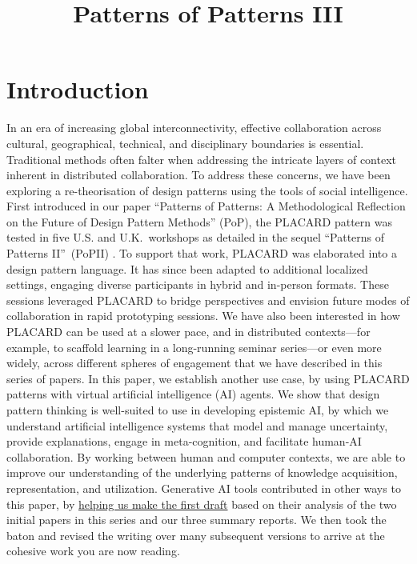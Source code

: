 \documentclass[acmlarge,timestamp]{acmart}
\date{}
\title{Patterns of Patterns III}
\begin{document}



\section{Introduction}\label{sec:intro}

In an era of increasing global interconnectivity, effective collaboration across cultural, geographical, technical, and disciplinary boundaries is essential. Traditional methods often falter when addressing the intricate layers of context inherent in distributed collaboration.  To address these concerns, we have been exploring a re-theorisation of design patterns using the tools of social intelligence.  First introduced in our paper “Patterns of Patterns: A Methodological Reflection on the Future of Design Pattern Methods” (PoP), the PLACARD pattern was tested in five U.S. and U.K.~workshops as detailed in the sequel “Patterns of Patterns II”~(PoPII) \cite{10.5555/3712039.3712044,10.5555/3721041.3721050}.  To support that work, PLACARD was elaborated into a design pattern language.  It has since been adapted to additional localized settings, engaging diverse participants in hybrid and in-person formats. These sessions leveraged PLACARD to bridge perspectives and envision future modes
of collaboration in rapid prototyping sessions.  We have also been interested in how PLACARD can be used at a slower pace, and in distributed contexts—for example, to scaffold learning in a long-running seminar series—or even more widely, across different spheres of engagement that we have described in this series of papers.  In this paper, we establish another use case, by using PLACARD patterns with virtual artificial intelligence (AI) agents.  We show that design pattern thinking is well-suited to use in developing epistemic AI, by which we understand artificial intelligence systems that model and manage uncertainty, provide explanations, engage in meta-cognition, and facilitate human-AI collaboration. By working between human and computer contexts, we are able to improve our understanding of the underlying patterns of knowledge acquisition, representation, and utilization.  Generative AI tools contributed in other ways to this paper, by
\href{https://www.google.com/url?q=https://groups.google.com/g/peeragogy/c/XM7RKMDdcT4\&sa=D\&source=editors\&ust=1749305683239949\&usg=AOvVaw1GJKEDppYQy3WrqXEi9SV9}{helping us make the first draft} based on their analysis of the two initial papers in this series and our three summary reports. We then took the baton and revised the writing over many subsequent versions to arrive at the cohesive work you are now reading.
\end{document}
